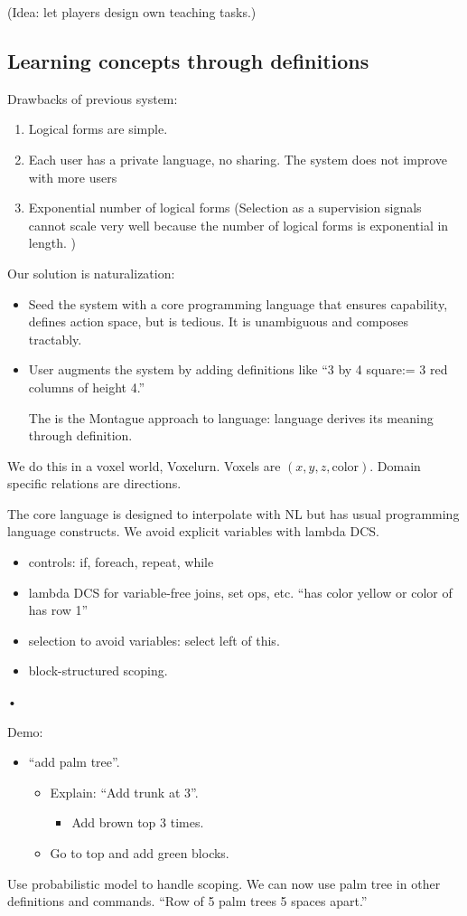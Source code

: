 (Idea: let players design own teaching tasks.)

\subsection{Learning concepts through definitions}

Drawbacks of previous system:
\begin{enumerate}
\item
Logical forms are simple.
\item
Each user has a private language, no sharing. The system does not improve with more users
\item
Exponential number of logical forms (Selection as a supervision signals cannot scale very well because the number of logical forms is exponential in length. )
\end{enumerate}

Our solution is naturalization: 
\begin{itemize}
\item
Seed the system with a core programming language that ensures capability, defines action space, but is tedious.
It is unambiguous and composes tractably.
\item
User augments the system by adding definitions like ``3 by 4 square:= 3 red columns of height 4.''

The is the Montague approach to  language: language derives its meaning through definition.
\end{itemize}

We do this in a voxel world, Voxelurn. Voxels are $(x,y,z,\text{color})$. Domain specific relations are directions.  

The core language is designed to interpolate with NL but has usual programming language constructs. We avoid explicit variables with lambda DCS.
\begin{itemize}
\item
controls: if, foreach, repeat, while
\item
lambda DCS for variable-free joins, set ops, etc. ``has color yellow or color of has row 1''
\item
selection to avoid variables: select left of this.
\item
block-structured scoping.
\end{itemize}•

Demo: 
\begin{itemize}
\item
``add palm tree''. 
\begin{itemize}
\item
Explain: ``Add trunk at 3''.
\begin{itemize}
\item
Add brown top 3 times.
\end{itemize}
\item
Go to top and add green blocks.
\end{itemize}
\end{itemize}
Use probabilistic model to handle scoping. We can now use palm tree in other definitions and commands. ``Row of 5 palm trees 5 spaces apart.''

